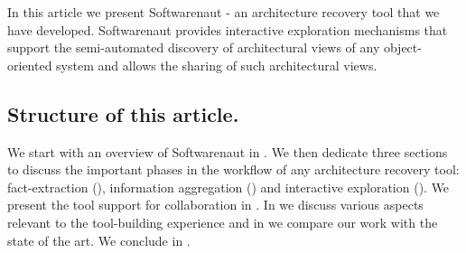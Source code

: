 \documentclass[preprint,12pt]{elsarticle}
\begin{document}






In this article we present Softwarenaut - an architecture recovery tool that we have developed. Softwarenaut provides interactive exploration mechanisms that support the semi-automated discovery of architectural views of any object-oriented system and allows the sharing of such architectural views. 

\subsection*{Structure of this article.} We start with an overview of Softwarenaut in . We then dedicate three sections to discuss the important phases in the workflow of any architecture recovery tool: fact-extraction (), information aggregation () and interactive exploration (). We present the tool support for collaboration in . In  we discuss various aspects relevant to the tool-building experience and in  we compare our work with the state of the art. We conclude in .
\end{document}
